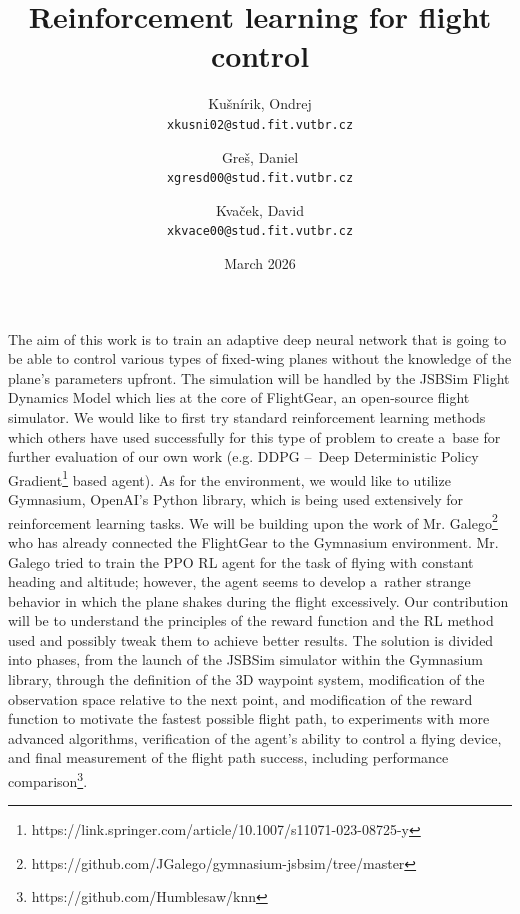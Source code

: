 \documentclass{article}
\title{Reinforcement learning for flight control}
\author{Kušnírik, Ondrej\\
        \texttt{xkusni02@stud.fit.vutbr.cz}
        \and
        Greš, Daniel\\
        \texttt{xgresd00@stud.fit.vutbr.cz}
        \and
        Kvaček, David\\
        \texttt{xkvace00@stud.fit.vutbr.cz}
        }
\date{March 2026}
\begin{document}
\maketitle

The aim of this work is to train an adaptive deep neural network that is going to be able to control various types of fixed-wing planes without the knowledge of the plane's parameters upfront.
The simulation will be handled by the JSBSim Flight Dynamics Model which lies at the core of FlightGear, an open-source flight simulator.
We would like to first try standard reinforcement learning methods which others have used successfully for this type of problem to create a~base for further evaluation of our own work (e.g. DDPG --~Deep Deterministic Policy Gradient\footnote{https://link.springer.com/article/10.1007/s11071-023-08725-y} based agent).
As for the environment, we would like to utilize Gymnasium, OpenAI's Python library, which is being used extensively for reinforcement learning tasks.
We will be building upon the work of Mr. Galego\footnote{https://github.com/JGalego/gymnasium-jsbsim/tree/master} who has already connected the FlightGear to the Gymnasium environment.
Mr. Galego tried to train the PPO RL agent for the task of flying with constant heading and altitude; however, the agent seems to develop a~rather strange behavior in which the plane shakes during the flight excessively.
Our contribution will be to understand the principles of the reward function and the RL method used and possibly tweak them to achieve better results.
The solution is divided into phases, from the launch of the JSBSim simulator within the Gymnasium library, through the definition of the 3D waypoint system, modification of the observation space relative to the next point, and modification of the reward function to motivate the fastest possible flight path, to experiments with more advanced algorithms, verification of the agent's ability to control a flying device, and final measurement of the flight path success, including performance comparison\footnote{https://github.com/Humblesaw/knn}.
\end{document}

